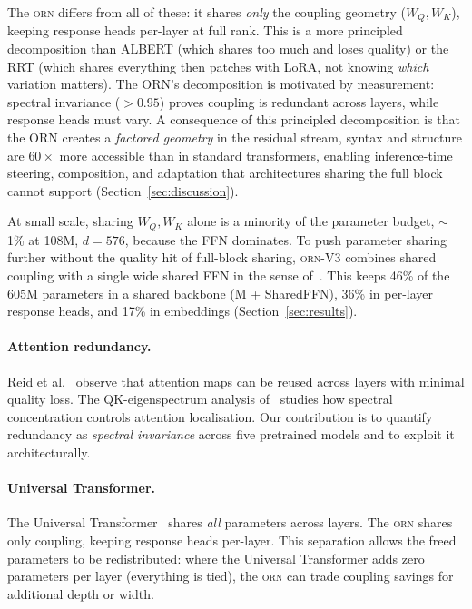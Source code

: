 \documentclass[10pt,twocolumn]{article}
\newcommand{\orn}{\textsc{orn}}
\begin{document}
The \orn{} differs from all of these: it shares \emph{only} the coupling geometry ($W_Q, W_K$), keeping response heads per-layer at full rank.
This is a more principled decomposition than ALBERT (which shares too much and loses quality) or the RRT (which shares everything then patches with LoRA, not knowing \emph{which} variation matters).
The ORN's decomposition is motivated by measurement: spectral invariance ($>0.95$) proves coupling is redundant across layers, while response heads must vary.
A consequence of this principled decomposition is that the ORN creates a \emph{factored geometry} in the residual stream, syntax and structure are $60\times$ more accessible than in standard transformers, enabling inference-time steering, composition, and adaptation that architectures sharing the full block cannot support (Section~\ref{sec:discussion}).

At small scale, sharing $W_Q, W_K$ alone is a minority of the parameter budget, $\sim$1\% at 108M, $d{=}576$, because the FFN dominates.
To push parameter sharing further without the quality hit of full-block sharing, \orn{}-V3 combines shared coupling with a single wide shared FFN in the sense of~\cite{onewideffn2023}.
This keeps 46\% of the 605M parameters in a shared backbone (M + SharedFFN), 36\% in per-layer response heads, and 17\% in embeddings (Section~\ref{sec:results}).

\paragraph{Attention redundancy.}
Reid et al.~\cite{reid2021reuse} observe that attention maps can be reused across layers with minimal quality loss.
The QK-eigenspectrum analysis of~\cite{qk2024eigenspectrum} studies how spectral concentration controls attention localisation.
Our contribution is to quantify redundancy as \emph{spectral invariance} across five pretrained models and to exploit it architecturally.

\paragraph{Universal Transformer.}
The Universal Transformer~\cite{dehghani2018universal} shares \emph{all} parameters across layers.
The \orn{} shares only coupling, keeping response heads per-layer.
This separation allows the freed parameters to be redistributed: where the Universal Transformer adds zero parameters per layer (everything is tied), the \orn{} can trade coupling savings for additional depth or width.
\end{document}
